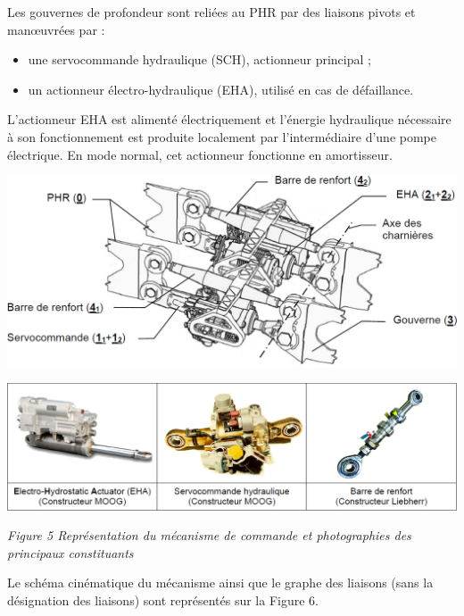 \begin{multicols}{2}
Les gouvernes de profondeur sont reliées au PHR par des liaisons pivots et man\oe{}uvrées par :
\begin{itemize}
\item une servocommande hydraulique (SCH), actionneur principal ;
\item un actionneur électro-hydraulique (EHA), utilisé en cas de défaillance.
\end{itemize}
L’actionneur EHA est alimenté électriquement et l’énergie hydraulique nécessaire à son fonctionnement
est produite localement par l’intermédiaire d’une pompe électrique. En mode normal, cet actionneur
fonctionne en amortisseur.

\begin{center}
\includegraphics[width=\linewidth]{images/fig_05}

\includegraphics[width=\linewidth]{images/fig_06}

\textit{Figure 5 Représentation du mécanisme de commande et photographies des principaux constituants}
\end{center}


Le schéma cinématique du mécanisme ainsi que le graphe des liaisons (sans la désignation des liaisons)
sont représentés sur la Figure 6.


\end{multicols}

